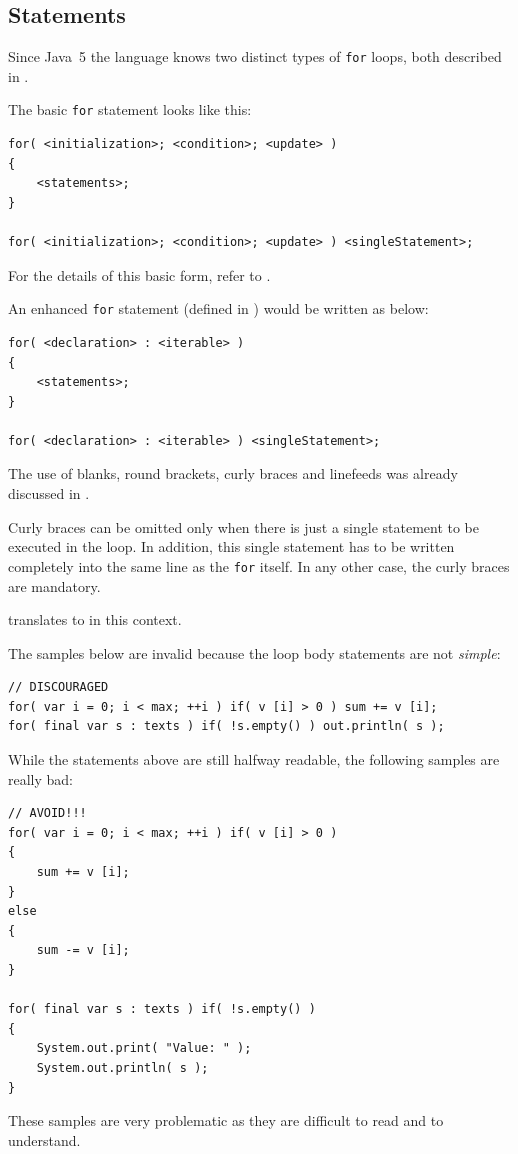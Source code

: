 \subsection{ Statements}\label{sec:ForStatements}
Since Java~5 the language knows two distinct types of \lstinline|for| loops, both described in \autocite{ORACLE_DOC_LANGUAGE_SPECIFICATION:For}.

The basic \lstinline|for| statement looks like this:
\begin{lstlisting}
for( <initialization>; <condition>; <update> )
{
    <statements>;
}

for( <initialization>; <condition>; <update> ) <singleStatement>;
\end{lstlisting}
For the details of this basic form, refer to \autocite{ORACLE_DOC_LANGUAGE_SPECIFICATION:ForBasic}.

An enhanced \lstinline|for| statement (defined in \autocite{ORACLE_DOC_LANGUAGE_SPECIFICATION:ForEnhanced}) would be written as below:

\begin{lstlisting}
for( <declaration> : <iterable> )
{
    <statements>;
}

for( <declaration> : <iterable> ) <singleStatement>;
\end{lstlisting}

The use of blanks, round brackets, curly braces and linefeeds was already discussed in .

Curly braces can be omitted only when there is just a single statement to be executed in the loop. In addition, this single statement has to be written completely into the same line as the \lstinline|for| itself. In any other case, the curly braces are mandatory.

 translates to  in this context.

The samples below are invalid because the loop body statements are not \textit{simple}:
\begin{lstlisting}
// DISCOURAGED
for( var i = 0; i < max; ++i ) if( v [i] > 0 ) sum += v [i];
for( final var s : texts ) if( !s.empty() ) out.println( s );
\end{lstlisting}

While the statements above are still halfway readable, the following samples are really bad:
\begin{lstlisting}
// AVOID!!!
for( var i = 0; i < max; ++i ) if( v [i] > 0 )
{
    sum += v [i];
}
else
{
    sum -= v [i];
}

for( final var s : texts ) if( !s.empty() )
{
    System.out.print( "Value: " );
    System.out.println( s );
}
\end{lstlisting}
These samples are very problematic as they are difficult to read and to understand.

